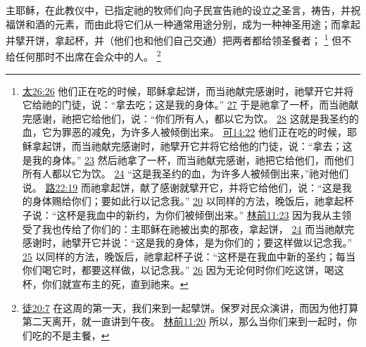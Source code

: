 \documentclass[12pt, a4paper, oneside]{ctexart}
\newcounter{parnum}[section]
\newcommand{\N}{%
   \noindent\refstepcounter{parnum}%
    \makebox[\parindent][l]{\textbf{\arabic{parnum}.}}}
\begin{document}
\N 主耶稣，在此教仪中，已指定祂的牧师们向子民宣告祂的设立之圣言，祷告，并祝福饼和酒的元素，而由此将它们从一种通常用途分别，成为一种神圣用途；而拿起并擘开饼，拿起杯，并（他们也和他们自己交通）把两者都给领圣餐者；
	\footnote {
		\href{https://biblehub.com/matthew/26-26.htm}{太26:26} 他们正在吃的时候，耶稣拿起饼，而当祂献完感谢时，祂擘开它并将它给祂的门徒，说：“拿去吃；这是我的身体。”
		\href{https://biblehub.com/matthew/26-27.htm}{27} 于是祂拿了一杯，而当祂献完感谢，祂把它给他们，说：“你们所有人，都以它为饮。
		\href{https://biblehub.com/matthew/26-28.htm}{28} 这就是我圣约的血，它为罪恶的减免，为许多人被倾倒出来。
		\href{https://biblehub.com/mark/14-22.htm}{可14:22} 他们正在吃的时候，耶稣拿起饼，而当祂献完感谢时，祂擘开它并将它给他的门徒，说：“拿去；这是我的身体。”
		\href{https://biblehub.com/mark/14-23.htm}{23} 然后祂拿了一杯，而当祂献完感谢，祂把它给他们，而他们所有人都以它为饮。
		\href{https://biblehub.com/mark/14-24.htm}{24} “这是我圣约的血，为许多人被倾倒出来，”祂对他们说。
		\href{https://biblehub.com/luke/22-19.htm}{路22:19} 而祂拿起饼，献了感谢就擘开它，并将它给他们，说：“这是我的身体赐给你们；要如此行以记念我。”
		\href{https://biblehub.com/luke/22-20.htm}{20} 以同样的方法，晚饭后，祂拿起杯子说：“这杯是我血中的新约，为你们被倾倒出来。”
		\href{https://biblehub.com/1_corinthians/11-23.htm}{林前11:23} 因为我从主领受了我也传给了你们的：主耶稣在祂被出卖的那夜，拿起饼，
		\href{https://biblehub.com/1_corinthians/11-24.htm}{24} 而当祂献完感谢时，祂擘开它并说：“这是我的身体，是为你们的；要这样做以记念我。”
		\href{https://biblehub.com/1_corinthians/11-25.htm}{25} 以同样的方法，晚饭后，祂拿起杯子说：“这杯是在我血中新的圣约；每当你们喝它时，都要这样做，以记念我。”
		\href{https://biblehub.com/1_corinthians/11-26.htm}{26} 因为无论何时你们吃这饼，喝这杯，你们就宣布主的死，直到祂来。
	}
	但不给任何那时不出席在会众中的人。
	\footnote {
		\href{https://biblehub.com/acts/20-7.htm}{徒20:7} 在这周的第一天，我们来到一起擘饼。保罗对民众演讲，而因为他打算第二天离开，就一直讲到午夜。
		\href{https://biblehub.com/1_corinthians/11-20.htm}{林前11:20} 所以，那么当你们来到一起时，你们吃的不是主餐，
	}
\end{document}
